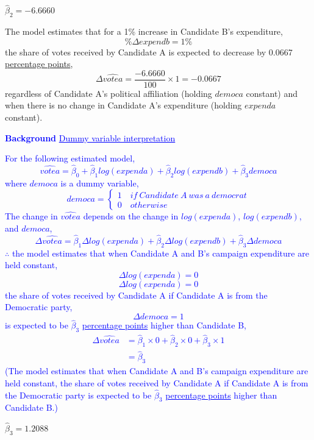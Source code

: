 \documentclass[12pt]{report}
\newenvironment{blueframed}[1][blue]
{\def\FrameCommand{\fboxsep=\FrameSep\fcolorbox{#1}{white}}%
	\MakeFramed {\advance\hsize-\width \FrameRestore}}
{\endMakeFramed}
\begin{document}
\vspace{10mm}
\noindent $\hat{\beta}_2 = -6.6660$

\noindent The model estimates that for a 1\% increase in Candidate B’s expenditure,
$$\%{\Delta}expendb = 1\%$$
the share of votes received by Candidate A is expected to decrease by 0.0667 \uline{percentage points},
$${\Delta}\widehat{votea} = \dfrac{-6.6660}{100}\times1=-0.0667$$
regardless of Candidate A’s political affiliation (holding $democa$ constant) and when there is no change in Candidate A’s expenditure (holding $expenda$ constant).


\newpage
\justify
\begin{blueframed}
	\textcolor{blue}{\textbf{Background}}
	\vspace{-\baselineskip}
	\justify
	\textcolor{blue}{\underline{Dummy variable interpretation}}
	
	\noindent \textcolor{blue} 
	{
		For the following estimated model, $$\widehat{votea} = \hat{\beta}_0 + \hat{\beta}_1log(expenda) + \hat{\beta}_2log(expendb) + \hat{\beta}_3democa$$ where $democa$ is a dummy variable, $$democa = \begin{cases}
		1 \quad if\ Candidate\ A\ was\ a\ democrat \\
		0 \quad otherwise
		\end{cases}$$ The change in $\widehat{votea}$ depends on the change in $log(expenda)$, $log(expendb)$, and $democa$, $$\Delta \widehat{votea} = \hat{\beta}_1\Delta log(expenda) + \hat{\beta}_2\Delta log(expendb) + \hat{\beta}_3\Delta democa$$ $\therefore$ the model estimates that when Candidate A and B's campaign expenditure are held constant, $$\Delta log(expenda) = 0$$ $$\Delta log(expenda) = 0$$ the share of votes received by Candidate A if Candidate A is from the Democratic party, $$\Delta democa = 1$$ is expected to be $\hat{\beta}_3$ \uline{percentage points} higher than Candidate B, \begin{align*}
		\Delta \widehat{votea} &= \hat{\beta}_1\times 0 + \hat{\beta}_2\times 0 + \hat{\beta}_3\times 1 \\
		&= \hat{\beta}_3
		\end{align*} (The model estimates that when Candidate A and B's campaign expenditure are held constant, the share of votes received by Candidate A if Candidate A is from the Democratic party is expected to be $\hat{\beta}_3$ \uline{percentage points} higher than Candidate B.)
	}
\end{blueframed}

\noindent $\hat{\beta}_3 = 1.2088$
\end{document}
